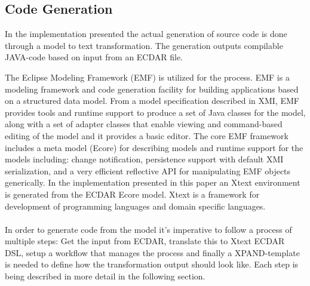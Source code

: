 \subsection{Code Generation \label{implementation-code-generation}}
In the implementation presented the actual generation of source code is done through a model to text transformation. The generation outputs compilable JAVA-code based on input from an ECDAR file.

The Eclipse Modeling Framework (EMF) is utilized for the process. EMF is a modeling framework and code generation facility for building applications based on a structured data model. From a model specification described in XMI, EMF provides tools and runtime support to produce a set of Java classes for the model, along with a set of adapter classes that enable viewing and command-based editing of the model and it provides a basic editor.
The core EMF framework includes a meta model (Ecore) for describing models and runtime support for the models including: change notification, persistence support with default XMI serialization, and a very efficient reflective API for manipulating EMF objects generically. In the implementation presented in this paper an Xtext environment is generated from the ECDAR Ecore model. Xtext is a framework for development of programming languages and domain specific languages.
\\
\\
In order to generate code from the model it's imperative to follow a process of multiple steps: Get the input from ECDAR, translate this to Xtext ECDAR DSL, setup a workflow that manages the process and finally a XPAND-template is needed to define how the transformation output should look like. Each step is being described in more detail in the following section.

